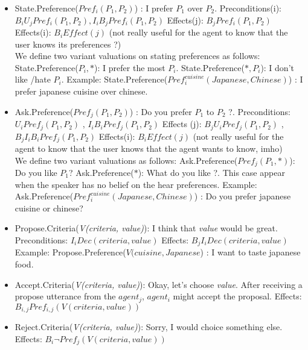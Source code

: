 \documentclass{llncs}
\begin{document}
 \begin{itemize}
 \item State.Preference(\textit{$Pref_{i}(P_{1}, P_{2})$}) : I prefer $P_{1}$ over $P_{2}$.
 \subitem Preconditions(i):  $ B_{i} U_{j} Pref_{i}(P_{1}, P_{2}), I_{i} B_{j} Pref_{i}(P_{1}, P_{2})$
 \subitem Effects(j): $ B_{j} Pref_{i}(P_{1}, P_{2})$
 \subitem Effects(i): $ B_i Effect(j)$ (not really useful for the agent to know that the user knows its preferences ?)
 \\ We define two variant valuations on stating preferences as follows: 
 \subitem State.Preference(\textit{$P_{i}, *$}): I prefer the most $P_{i}$.
 \subitem State.Preference(\textit{$*, P_{i}$}): I don't like /hate $P_{i}$.
\subitem Example: State.Preference(\textit{$Pref_{i}^{cuisine} (Japanese , Chinese)$}) : I prefer japanese cuisine over chinese.
 \item Ask.Preference(\textit{$Pref_{j}(P_{1}, P_{2})$}) : Do you prefer $P_{1}$ to $P_{2}$ ?. 
  \subitem Preconditions:  $ U_{i} Pref_{j}(P_{1}, P_{2})$ ,  $ I_{i} B_{i} Pref_{j}(P_{1}, P_{2})$
  \subitem Effects (j):  $B_{j} U_{i} Pref_{j}(P_{1}, P_{2})$ ,  $ B_{j} I_{i} B_{i}Pref_{j}(P_{1}, P_{2})$
   \subitem Effects(i): $ B_i Effect(j)$ (not really useful for the agent to know that the user knows that the agent wants to know, imho)
 \\We define two variant valuations as follows: 
 \subitem Ask.Preference(\textit{$Pref_{j}(P_{1}, *)$}): Do you like $P_{1}$?
 \subitem Ask.Preference(\textit{$*$}): What do you like ?. This case appear when the speaker has no belief on the hear preferences. 
 \subitem Example: Ask.Preference(\textit{$Pref_{i}^{cuisine} (Japanese , Chinese)$}) : Do you prefer japanese cuisine or chinese?
 
 \item Propose.Criteria(\textit{V(criteria, value)}): I think that \textit{value}  would be great. 
  \subitem Preconditions:  $ I_{i} Dec(criteria, value) $
  \subitem Effects:  $B_{j} I_{i} Dec(criteria, value)$
   \subitem Example: Propose.Preference(\textit{$V(cuisine,Japanese$}) : I want to taste japanese food.
 \item Accept.Criteria(\textit{V(criteria, value)}): Okay, let's choose \textit{value}. After receiving a propose utterance from the $agent_{j}$,  $agent_{i}$ might accept the proposal.
   \subitem Effects:  $B_{i,j} Pref_{i,j}(V(criteria, value))$
   
 \item Reject.Criteria(\textit{V(criteria, value)}): Sorry, I would choice something else.
    \subitem Effects:  $B_{i} \neg  Pref_{j}(V(criteria, value))$
 

\end{itemize}
\end{document}
